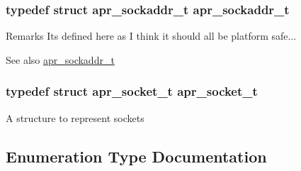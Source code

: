 \subsubsection[{\texorpdfstring{apr\+\_\+sockaddr\+\_\+t}{apr_sockaddr_t}}]{\setlength{\rightskip}{0pt plus 5cm}typedef struct {\bf apr\+\_\+sockaddr\+\_\+t} {\bf apr\+\_\+sockaddr\+\_\+t}}\hypertarget{group__apr__network__io_ga373fb6f32d0875c5deb648b779c8a709}{}\label{group__apr__network__io_ga373fb6f32d0875c5deb648b779c8a709}
\begin{DoxyRemark}{Remarks}
It\textquotesingle{}s defined here as I think it should all be platform safe... 
\end{DoxyRemark}
\begin{DoxySeeAlso}{See also}
\hyperlink{structapr__sockaddr__t}{apr\+\_\+sockaddr\+\_\+t} 
\end{DoxySeeAlso}
\subsubsection[{\texorpdfstring{apr\+\_\+socket\+\_\+t}{apr_socket_t}}]{\setlength{\rightskip}{0pt plus 5cm}typedef struct {\bf apr\+\_\+socket\+\_\+t} {\bf apr\+\_\+socket\+\_\+t}}\hypertarget{group__apr__network__io_ga49262b223e7434746e1f1737659aa2c3}{}\label{group__apr__network__io_ga49262b223e7434746e1f1737659aa2c3}
A structure to represent sockets 

\subsection{Enumeration Type Documentation}
